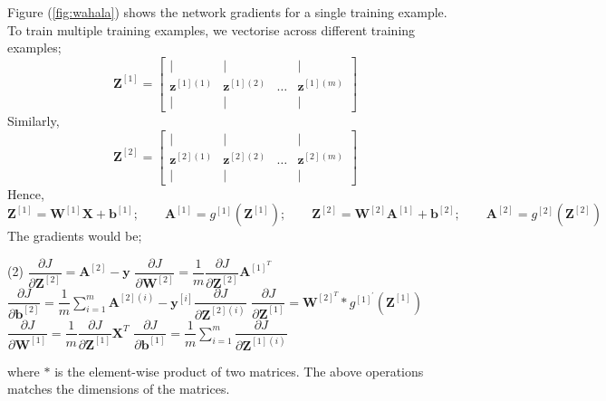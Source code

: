 \documentclass[12pt]{report}
\numberwithin{equation}{section}
\begin{document}
Figure (\ref{fig:wahala}) shows the network gradients for a single training example. To train multiple training examples, we vectorise across different training examples;
\begin{equation}\label{eqn:train3}
\bm{Z}^{[1]} = \left[\begin{array}{cccc}
		 | & | &  & | \\
		 \bm{z}^{[1](1)} & \bm{z}^{[1](2)} & \hdots & \bm{z}^{[1](m)} \\
		 | & | &  & |
		 \end{array}\right]
\end{equation}
Similarly,
\begin{equation}\label{eqn:train4}
\bm{Z}^{[2]} = \left[\begin{array}{cccc}
		 | & | &  & | \\
		 \bm{z}^{[2](1)} & \bm{z}^{[2](2)} & \hdots & \bm{z}^{[2](m)} \\
		 | & | &  & |
		 \end{array}\right]
\end{equation}
Hence,
\[
\bm{Z}^{[1]}  = \bm{W}^{[1]} \bm{X} + \bm{b}^{[1]}; \qquad \bm{A}^{[1]} = g^{[1]}(\bm{Z}^{[1]}); \qquad \bm{Z}^{[2]}  = \bm{W}^{[2]} \bm{A}^{[1]} + \bm{b}^{[2]}; \qquad \bm{A}^{[2]} = g^{[2]}(\bm{Z}^{[2]})
\]
The gradients would be;
\begin{tasks}[label = {}](2)
\task $\dfrac{\partial J}{\partial \bm{Z}^{[2]}} = \bm{A}^{[2]} - \bm{y} $
\task $ \dfrac{\partial J}{\partial \bm{W}^{[2]}} = \dfrac{1}{m}  \dfrac{\partial J}{\partial \bm{Z}^{[2]}} \bm{A}^{[1]^T} $
\task $ \dfrac{\partial J}{\partial \bm{b}^{[2]}} = \dfrac{1}{m}\sum\limits_{i=1}^m \bm{A}^{[2]{(i)}} - \bm{y}^{[i]} \dfrac{\partial J}{\partial \bm{Z}^{[2](i)}} $
\task $ \dfrac{\partial J}{\partial \bm{Z}^{[1]}} = \bm{W}^{[2]^T} * g^{[1]^{\prime}}( \bm{Z}^{[1]}) $
\task $ \dfrac{\partial J}{\partial \bm{W}^{[1]}} = \dfrac{1}{m} \dfrac{\partial J}{\partial \bm{Z}^{[1]}} \bm{X}^T $
\task $ \dfrac{\partial J}{\partial \bm{b}^{[1]}} = \dfrac{1}{m} \sum\limits_{i=1}^m \dfrac{\partial J}{\partial \bm{Z}^{[1](i)}} $
\end{tasks}
where $*$ is the element-wise product of two matrices. The above operations matches the dimensions of the matrices.
\end{document}
